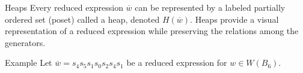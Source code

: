 \documentclass[9pt,handout]{beamer}
\newcommand{\w}{\overline{w}}
\newcommand\heapblock[4]{\fill[fill=#4, fill opacity=0.35, draw=#4, line width=1.1pt, rounded corners,shift={(\xxaxis:#1)},shift={(\yyaxis:#2)}] (-1,-1) rectangle (1,1);\node at (#1,#2) {\footnotesize $#3$};}
\newcommand\xxaxis{0}
\newcommand\yyaxis{90}
\begin{document}
\begin{frame}{Heaps}
Every reduced expression $\w$ can be represented by a labeled partially ordered set (poset) called a heap, denoted $H(\w)$. Heaps provide a visual representation of a reduced expression while preserving the relations among the generators.

\pause

\begin{block}{Example}
Let $\w=s_4s_5s_1s_0s_2s_4s_1$ be a reduced expression for $w \in W(B_6)$.
\begin{columns}
\begin{column}{0.4\textwidth}
\begin{figure}\centering
{}	
\end{figure}
\end{column}
\pause
\begin{column}{0.4\textwidth}
\begin{figure}\centering
{}
\end{figure}	
\end{column}
\end{columns}
\end{block}
	
\end{frame}

\end{document}
